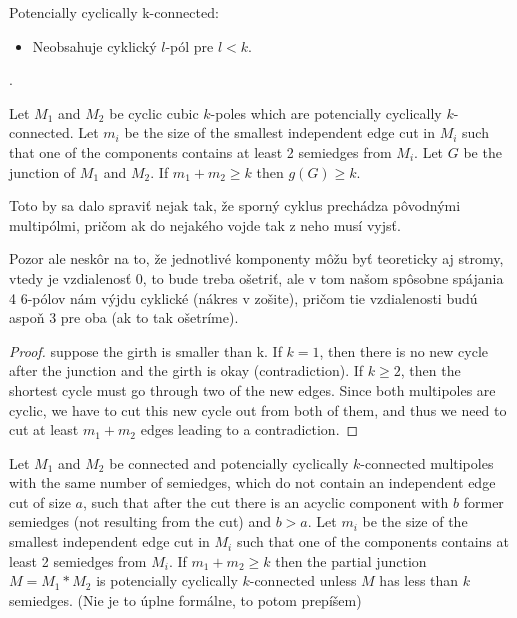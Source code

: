 \documentclass[12pt, twoside]{book}
\begin{document}
Potencially cyclically k-connected:
\begin{itemize}
	\item Neobsahuje cyklický $l$-pól pre $l<k$.
\end{itemize}

.

\begin{lemma}\label{le:junction-two-no-small-girth}
	Let $M_1$ and $M_2$ be cyclic cubic $k$-poles which are potencially cyclically $k$-connected. Let $m_i$ be the size of the smallest independent edge cut in $M_i$ such that one of the components contains at least 2 semiedges from $M_i$. Let $G$ be the junction of $M_1$ and $M_2$. If $m_1+m_2\geq k$ then $g(G)\geq k$.
\end{lemma}

 Toto by sa dalo spraviť nejak tak, že sporný cyklus prechádza pôvodnými multipólmi, pričom ak do nejakého vojde tak z neho musí vyjsť. 

Pozor ale neskôr na to, že jednotlivé komponenty môžu byť teoreticky aj stromy, vtedy je vzdialenosť 0, to bude treba ošetriť, ale v tom našom spôsobne spájania 4 6-pólov nám výjdu cyklické (nákres v zošite), pričom tie vzdialenosti budú aspoň 3 pre oba (ak to tak ošetríme).

\begin{proof}
	\todo{} suppose the girth is smaller than k. If $k=1$, then there is no new cycle after the junction and the girth is okay (contradiction). If $k\geq 2$, then the shortest cycle must go through two of the new edges. Since both multipoles are cyclic, we have to cut this new cycle out from both of them, and thus we need to cut at least $m_1+m_2$ edges leading to a contradiction.
\end{proof}

\begin{theorem}\label{th:connecting-potencially-k-connected}
	Let $M_1$ and $M_2$ be connected and potencially cyclically $k$-connected multipoles with the same number of semiedges, which do not contain an independent edge cut of size $a$, such that after the cut there is an acyclic component with $b$ former semiedges (not resulting from the cut) and $b>a$. Let $m_i$ be the size of the smallest independent edge cut in $M_i$ such that one of the components contains at least 2 semiedges from $M_i$. If $m_1+m_2\geq k$ then the partial junction $M=M_1*M_2$ is potencially cyclically $k$-connected unless $M$ has less than $k$ semiedges. (Nie je to úplne formálne, to potom prepíšem)
\end{theorem}
\end{document}
